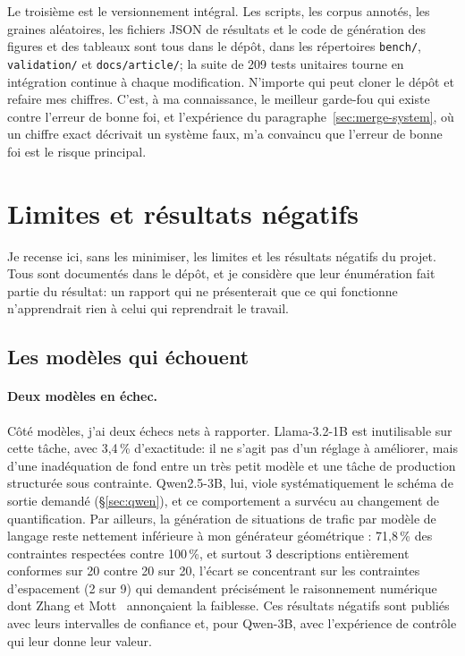 \documentclass[11pt,a4paper]{article}
\begin{document}
Le troisième est le versionnement intégral. Les scripts, les corpus annotés, les graines aléatoires, les fichiers JSON de résultats et le code de génération des figures et des tableaux sont tous dans le dépôt, dans les répertoires \texttt{bench/}, \texttt{validation/} et \texttt{docs/article/}; la suite de 209 tests unitaires tourne en intégration continue à chaque modification. N'importe qui peut cloner le dépôt et refaire mes chiffres. C'est, à ma connaissance, le meilleur garde-fou qui existe contre l'erreur de bonne foi, et l'expérience du paragraphe~\ref{sec:merge-system}, où un chiffre exact décrivait un système faux, m'a convaincu que l'erreur de bonne foi est le risque principal. 

\section{Limites et résultats négatifs}
\label{sec:limites}

Je recense ici, sans les minimiser, les limites et les résultats négatifs du projet. Tous sont documentés dans le dépôt, et je considère que leur énumération fait partie du résultat: un rapport qui ne présenterait que ce qui fonctionne n'apprendrait rien à celui qui reprendrait le travail.

\subsection{Les modèles qui échouent}

\paragraph{Deux modèles en échec.} Côté modèles, j'ai deux échecs nets à rapporter. Llama-3.2-1B est inutilisable sur cette tâche, avec 3,4\,\% d'exactitude: il ne s'agit pas d'un réglage à améliorer, mais d'une inadéquation de fond entre un très petit modèle et une tâche de production structurée sous contrainte. Qwen2.5-3B, lui, viole systématiquement le schéma de sortie demandé (\S\ref{sec:qwen}), et ce comportement a survécu au changement de quantification. Par ailleurs, la génération de situations de trafic par modèle de langage reste nettement inférieure à mon générateur géométrique : 71,8\,\% des contraintes respectées contre 100\,\%, et surtout 3 descriptions entièrement conformes sur 20 contre 20 sur 20, l'écart se concentrant sur les contraintes d'espacement (2 sur 9) qui demandent précisément le raisonnement numérique dont Zhang et Mott~\cite{zhang} annonçaient la faiblesse. Ces résultats négatifs sont publiés avec leurs intervalles de confiance et, pour Qwen-3B, avec l'expérience de contrôle qui leur donne leur valeur.
\end{document}
